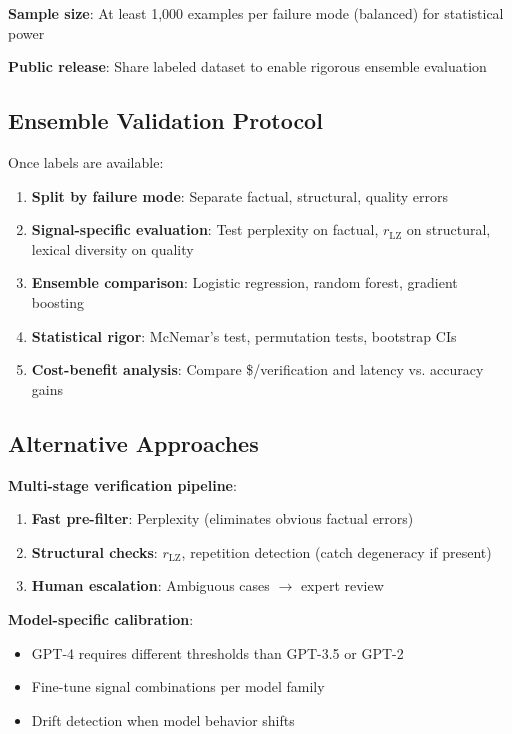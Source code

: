 \documentclass[11pt]{article}
\begin{document}
\textbf{Sample size}: At least 1,000 examples per failure mode (balanced) for statistical power

\textbf{Public release}: Share labeled dataset to enable rigorous ensemble evaluation

\subsection{Ensemble Validation Protocol}

Once labels are available:
\begin{enumerate}
\item \textbf{Split by failure mode}: Separate factual, structural, quality errors
\item \textbf{Signal-specific evaluation}: Test perplexity on factual, $r_{\text{LZ}}$ on structural, lexical diversity on quality
\item \textbf{Ensemble comparison}: Logistic regression, random forest, gradient boosting
\item \textbf{Statistical rigor}: McNemar's test, permutation tests, bootstrap CIs
\item \textbf{Cost-benefit analysis}: Compare \$/verification and latency vs. accuracy gains
\end{enumerate}

\subsection{Alternative Approaches}

\textbf{Multi-stage verification pipeline}:
\begin{enumerate}
\item \textbf{Fast pre-filter}: Perplexity (eliminates obvious factual errors)
\item \textbf{Structural checks}: $r_{\text{LZ}}$, repetition detection (catch degeneracy if present)
\item \textbf{Human escalation}: Ambiguous cases $\rightarrow$ expert review
\end{enumerate}

\textbf{Model-specific calibration}:
\begin{itemize}
\item GPT-4 requires different thresholds than GPT-3.5 or GPT-2
\item Fine-tune signal combinations per model family
\item Drift detection when model behavior shifts
\end{itemize}
\end{document}
